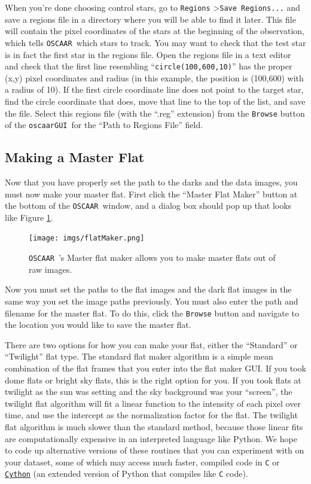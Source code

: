 \documentclass[a4paper]{article}
\newcommand{\code}[1]{\texttt{#1}}
\newcommand{\oscaar}{\code{OSCAAR}~}
\newcommand{\gui}{\code{oscaarGUI}~}
\begin{document}
When you're done choosing control stars, go to \code{Regions} \textgreater  \code{Save Regions...} and save a regions file in a directory where you will be able to find it later. This file will contain the pixel coordinates of the stars at the beginning of the observation, which tells \oscaar which stars to track. You may want to check that the test star is in fact the first star in the regions file. Open the regions file in a text editor and check that the first line resembling ``\code{circle(100,600,10)}'' has the proper (x,y) pixel coordinates and radius (in this example, the position is (100,600) with a radius of 10). If the first circle coordinate line does not point to the target star, find the circle coordinate that does, move that line to the top of the list, and save the file. Select this regions file (with the ``.reg'' extension) from the \code{Browse} button of the \gui for the ``Path to Regions File'' field.

\subsection{Making a Master Flat}
Now that you have properly set the path to the darks and the data images, you must now make your master flat. First click the ``Master Flat Maker'' button at the bottom of the \oscaar window, and a dialog box should pop up that looks like Figure \ref{fig:flats}.
\begin{figure}[H]
\begin{center}
\texttt{[image: imgs/flatMaker.png]}
\caption{\oscaar's Master flat maker allows you to make master flats out of raw images.}
\label{fig:flats}
\end{center}	
\end{figure}

Now you must set the paths to the flat images and the dark flat images in the same way you set the image paths previously. You must also enter the path and filename for the master flat. To do this, click the \code{Browse} button and navigate to the location you would like to save the master flat. 

There are two options for how you can make your flat, either  the ``Standard'' or ``Twilight'' flat type. The standard flat maker algorithm is a simple mean combination of the flat frames that you enter into the flat maker GUI. If you took dome flats or bright sky flats, this is the right option for you. If you took flats at twilight as the sun was setting and the sky background was your ``screen'', the twilight flat algorithm will fit a linear function to the intensity of each pixel over time, and use the intercept as the normalization factor for the flat. The twilight flat algorithm is much slower than the standard method, because those linear fits are computationally expensive in an interpreted language like Python. We hope to code up alternative versions of these routines that you can experiment with on your dataset, some of which may access much faster, compiled code in \code{C} or \code{\href{http://cython.org/}{Cython}} (an extended version of Python that compiles like \code{C} code).
\end{document}
